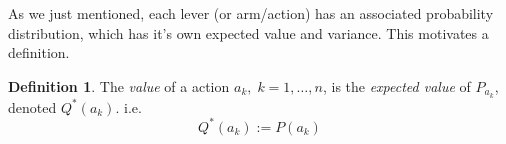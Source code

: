 \documentclass[11pt]{article}
\theoremstyle{definition}
\newtheorem{definition}{Definition}
\begin{document}
As we just mentioned, each lever (or arm/action) has an associated probability distribution, which has it's own expected value and variance.  This motivates a definition.

\begin{definition}
The \textit{value} of a action $a_k,\;k=1,\dots,n$, is the \textit{expected value} of $P_{a_k}$, denoted $Q^*(a_k)$.  i.e.
\[
    Q^*(a_k) := P(a_k)
\]
\end{definition}
\end{document}
